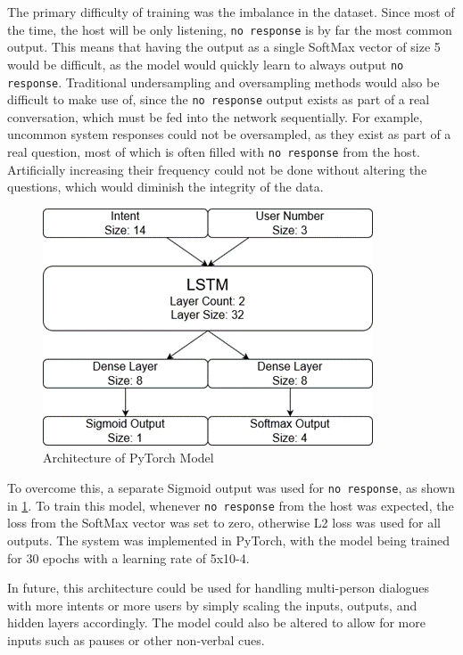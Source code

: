 \documentclass[hidelinks, 11pt]{article}
\begin{document}
The primary difficulty of training was the imbalance in the dataset. Since most of the time, the host will be only listening, \verb|no response| is by far the most common output. This means that having the output as a single SoftMax vector of size 5 would be difficult, as the model would quickly learn to always output \verb|no response|. Traditional undersampling and oversampling methods would also be difficult to make use of, since the \verb|no response| output exists as part of a real conversation, which must be fed into the network sequentially. For example, uncommon system responses could not be oversampled, as they exist as part of a real question, most of which is often filled with \verb|no response| from the host. Artificially increasing their frequency could not be done without altering the questions, which would diminish the integrity of the data.

\begin{figure}
  \includegraphics[width=\columnwidth]{images/DM_LSTM.png}
  \caption{Architecture of PyTorch Model}
  \label{fig:model_architecture}
\end{figure}

To overcome this, a separate Sigmoid output was used for \verb|no response|, as shown in \cref{fig:model_architecture}. To train this model, whenever \verb|no response| from the host was expected, the loss from the SoftMax vector was set to zero, otherwise L2 loss was used for all outputs. The system was implemented in PyTorch, with the model being trained for 30 epochs with a learning rate of 5x10-4.

In future, this architecture could be used for handling multi-person dialogues with more intents or more users by simply scaling the inputs, outputs, and hidden layers accordingly. The model could also be altered to allow for more inputs such as pauses or other non-verbal cues.
\end{document}
